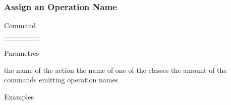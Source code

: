\documentclass[10pt]{beamer}
\begin{document}
\begin{frame}[t] \frametitle{Assign an Operation Name}

	\begin{block}{Command} 
		\begin{tabularx}{\textwidth}{@{}l@{}l@{}l@{}l@{}R}
			 &
				 &
				 &
				 & \InstrItem
		\end{tabularx}
	\end{block}

	\begin{block}{Parametres} \begin{itemize}
		    the name of the action
		     the name of one of the classes
		    the amount of the commands emitting operation names
	\end{itemize} \end{block}

	\begin{block}{Examples}
	\end{block}

\end{frame}
\end{document}
